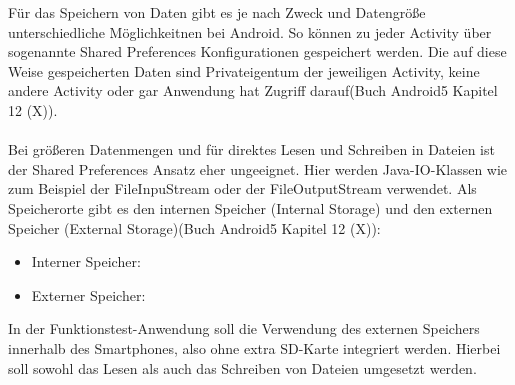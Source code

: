 Für das Speichern von Daten gibt es je nach Zweck und Datengröße unterschiedliche Möglichkeitnen bei Android. So können zu jeder Activity über sogenannte Shared Preferences Konfigurationen gespeichert werden. Die auf diese Weise gespeicherten Daten sind Privateigentum der jeweiligen Activity, keine andere Activity oder gar Anwendung hat Zugriff darauf(Buch Android5 Kapitel 12 (X)). 
\\
\\
Bei größeren Datenmengen und für direktes Lesen und Schreiben in Dateien ist der Shared Preferences Ansatz eher ungeeignet. Hier werden Java-IO-Klassen wie zum Beispiel der FileInpuStream oder der FileOutputStream verwendet. Als Speicherorte gibt es den internen Speicher (Internal Storage) und den externen Speicher (External Storage)(Buch Android5 Kapitel 12 (X)):

\begin{itemize}
\item Interner Speicher:
\item Externer Speicher:
\end{itemize}

In der Funktionstest-Anwendung soll die Verwendung des externen Speichers innerhalb des Smartphones, also ohne extra SD-Karte integriert werden. Hierbei soll sowohl das Lesen als auch das Schreiben von Dateien umgesetzt werden. 